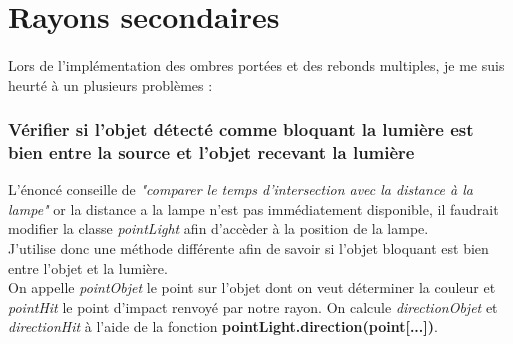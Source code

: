\documentclass{article}
\begin{document}
\section{Rayons secondaires}
\paragraph*{}
Lors de l'implémentation des ombres portées et des rebonds multiples, je me suis
heurté à un plusieurs problèmes :\\

\subsubsection*{Vérifier si l'objet détecté comme bloquant la lumière est bien entre la
source et l'objet recevant la lumière}
L'énoncé conseille de \textit{"comparer le temps d'intersection avec la distance
à la lampe"} or la distance a la lampe n'est pas immédiatement disponible, il
faudrait modifier la classe \textit{pointLight} afin d'accèder à la position
 de la lampe. \\
 J'utilise donc une méthode différente afin de savoir si l'objet bloquant est
 bien entre l'objet et la lumière.\\
 On appelle \textit{pointObjet} le point sur l'objet dont on veut
 déterminer la couleur et \textit{pointHit} le point d'impact renvoyé par notre rayon.
 On calcule \textit{directionObjet} et \textit{directionHit} à l'aide de la
 fonction \textbf{pointLight.direction(point[...])}.\\
\end{document}
